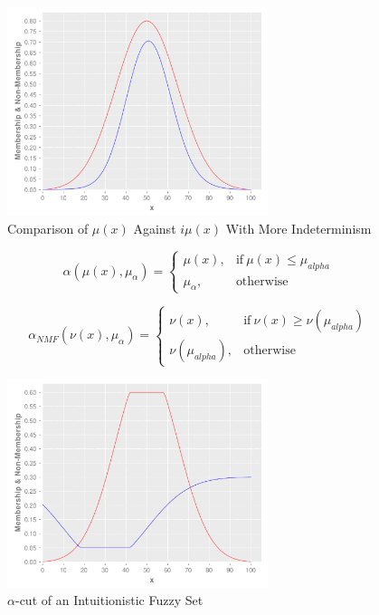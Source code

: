 \documentclass[conference]{IEEEtran}
\begin{document}
\begin{figure}[!t]
  \centering
  \includegraphics[width=3.0in]{if-membership-drastic}
  \caption{Comparison of $\mu(x)$ Against $i\mu(x)$ With More Indeterminism}
  \label{if-membership-drastic}
\end{figure}

\begin{equation}
  \label{alpha-cut}
  \alpha(\mu (x),\mu_{\alpha}) =
  \begin{cases}
    \mu (x), & \text{if}\ \mu (x) \leq \mu_{alpha}  \\
    \mu_{\alpha}, & \text{otherwise}
  \end{cases}
\end{equation}

\begin{equation}
  \label{nmf-alpha-cut}
  \alpha_{NMF}(\nu (x),\mu_{\alpha}) =
  \begin{cases}
    \nu (x), & \text{if}\ \nu (x) \geq \nu (\mu_{alpha})  \\
    \nu (\mu_{alpha}), & \text{otherwise}
  \end{cases}
\end{equation}

\begin{figure}[!t]
  \centering
  \includegraphics[width=3.0in]{alpha-cut}
  \caption{$\alpha$-cut of an Intuitionistic Fuzzy Set}
  \label{alpha-cut-example}
\end{figure}
\end{document}
